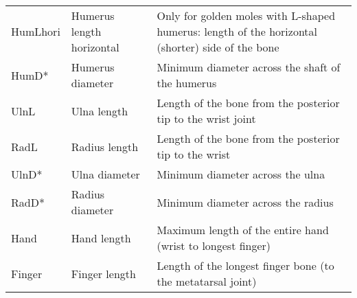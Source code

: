 \begin{longtable}{p{2.4cm}p{3.2cm}p{9.5cm}}
HumLhori & Humerus length horizontal & Only for golden moles with L-shaped humerus: length of the horizontal (shorter) side of the bone \\
HumD* & Humerus diameter & Minimum diameter across the shaft of the humerus \\
UlnL & Ulna length & Length of the bone from the posterior tip to the wrist joint \\
RadL & Radius length & Length of the bone from the posterior tip to the wrist \\
UlnD* & Ulna diameter & Minimum diameter across the ulna \\
RadD* & Radius diameter & Minimum diameter across the radius \\
Hand & Hand length & Maximum length of the entire hand (wrist to longest finger) \\
Finger & Finger length & Length of the longest finger bone (to the metatarsal joint) \\
\hline

\end{longtable}